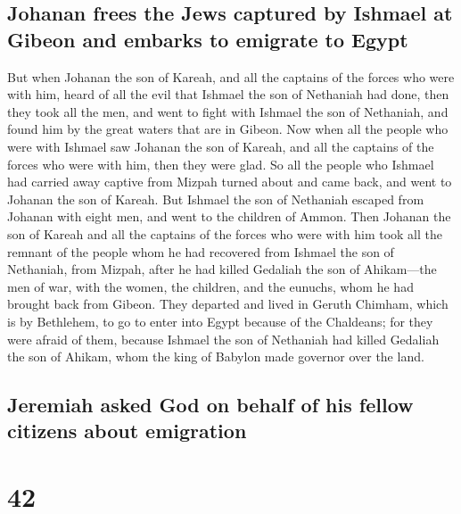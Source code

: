 \hypertarget{johanan-frees-the-jews-captured-by-ishmael-at-gibeon-and-embarks-to-emigrate-to-egypt}{%
\subsection{Johanan frees the Jews captured by Ishmael at Gibeon and
embarks to emigrate to
Egypt}\label{johanan-frees-the-jews-captured-by-ishmael-at-gibeon-and-embarks-to-emigrate-to-egypt}}

 But when Johanan the son of Kareah, and all the captains
of the forces who were with him, heard of all the evil that Ishmael the
son of Nethaniah had done,  then they took all the men,
and went to fight with Ishmael the son of Nethaniah, and found him by
the great waters that are in Gibeon.  Now when all the
people who were with Ishmael saw Johanan the son of Kareah, and all the
captains of the forces who were with him, then they were glad.
 So all the people who Ishmael had carried away captive
from Mizpah turned about and came back, and went to Johanan the son of
Kareah.  But Ishmael the son of Nethaniah escaped from
Johanan with eight men, and went to the children of Ammon.
 Then Johanan the son of Kareah and all the captains of
the forces who were with him took all the remnant of the people whom he
had recovered from Ishmael the son of Nethaniah, from Mizpah, after he
had killed Gedaliah the son of Ahikam---the men of war, with the women,
the children, and the eunuchs, whom he had brought back from Gibeon.
 They departed and lived in Geruth Chimham, which is by
Bethlehem, to go to enter into Egypt  because of the
Chaldeans; for they were afraid of them, because Ishmael the son of
Nethaniah had killed Gedaliah the son of Ahikam, whom the king of
Babylon made governor over the land.

\hypertarget{jeremiah-asked-god-on-behalf-of-his-fellow-citizens-about-emigration}{%
\subsection{Jeremiah asked God on behalf of his fellow citizens about
emigration}\label{jeremiah-asked-god-on-behalf-of-his-fellow-citizens-about-emigration}}

\hypertarget{section-41}{%
\section{42}\label{section-41}}

